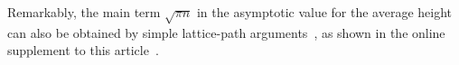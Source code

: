 \documentclass[11pt]{article}
\begin{document}
Remarkably, the main term $\sqrt{\pi n}$ in the asymptotic value for
the average height can also be obtained by simple lattice\hyp{}path
arguments~\cite{DershowitzZaks:1990}, as shown in the online
supplement to this article~\cite{Supplement:2015}.



\end{document}
